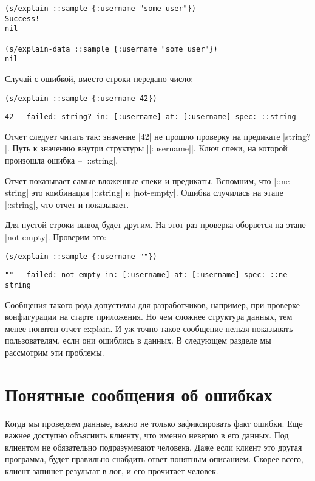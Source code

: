 \begin{verbatim}
(s/explain ::sample {:username "some user"})
Success!
nil

(s/explain-data ::sample {:username "some user"})
nil
\end{verbatim}

Случай с ошибкой, вместо строки передано число:

\begin{verbatim}
(s/explain ::sample {:username 42})
\end{verbatim}

\begin{verbatim}
42 - failed: string? in: [:username] at: [:username] spec: ::string
\end{verbatim}

Отчет следует читать так: значение \spverb|42| не прошло проверку на предикате
\spverb|string?|. Путь к значению внутри структуры \spverb|[:username]|. Ключ спеки, на
которой произошла ошибка -- \spverb|::string|.

Отчет показывает самые вложенные спеки и предикаты. Вспомним, что \spverb|::ne-string|
это комбинация \spverb|::string| и \spverb|not-empty|. Ошибка случилась на этапе \spverb|::string|,
что отчет и показывает.

Для пустой строки вывод будет другим. На этот раз проверка оборвется на этапе
\spverb|not-empty|. Проверим это:

\begin{verbatim}
(s/explain ::sample {:username ""})
\end{verbatim}

\begin{verbatim}
"" - failed: not-empty in: [:username] at: [:username] spec: ::ne-string
\end{verbatim}

Сообщения такого рода допустимы для разработчиков, например, при проверке
конфигурации на старте приложения. Но чем сложнее структура данных, тем менее
понятен отчет explain. И уж точно такое сообщение нельзя показывать
пользователям, если они ошиблись в данных. В следующем разделе мы рассмотрим эти
проблемы.

\section{Понятные сообщения об ошибках}

Когда мы проверяем данные, важно не только зафиксировать факт ошибки. Еще важнее
доступно объяснить клиенту, что именно неверно в его данных. Под клиентом не
обязательно подразумевают человека. Даже если клиент это другая программа, будет
правильно снабдить ответ понятным описанием. Скорее всего, клиент запишет
результат в лог, и его прочитает человек.

